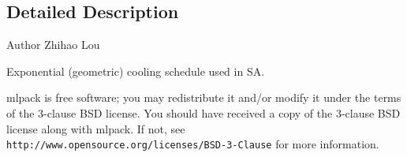 \subsection{Detailed Description}
\begin{DoxyAuthor}{Author}
Zhihao Lou
\end{DoxyAuthor}
Exponential (geometric) cooling schedule used in SA.

mlpack is free software; you may redistribute it and/or modify it under the terms of the 3-\/clause B\+SD license. You should have received a copy of the 3-\/clause B\+SD license along with mlpack. If not, see {\tt http\+://www.\+opensource.\+org/licenses/\+B\+S\+D-\/3-\/\+Clause} for more information. 